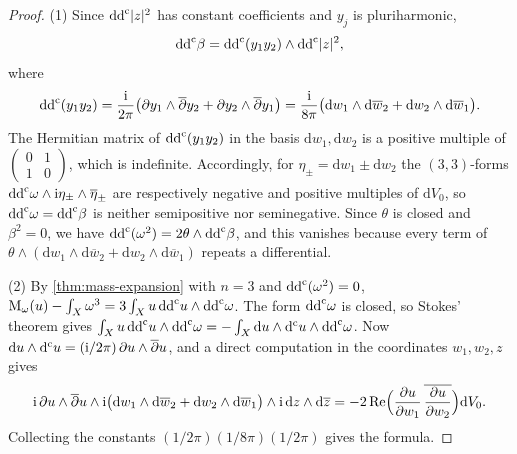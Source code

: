 \begin{proof}
(1) Since $\mathrm{dd}^{\mathrm{c}}|z|^2$ has constant coefficients and $y_j$ is pluriharmonic,
\[
 \mathrm{dd}^{\mathrm{c}}\beta=\mathrm{dd}^{\mathrm{c}}(y_1y_2)\wedge\mathrm{dd}^{\mathrm{c}}|z|^2,
\]
where
\[
 \mathrm{dd}^{\mathrm{c}}(y_1y_2)=\frac{\mathrm i}{2\pi}\bigl(\partial y_1\wedge\overline\partial y_2
       +\partial y_2\wedge\overline\partial y_1\bigr)
       =\frac{\mathrm i}{8\pi}\bigl(\mathrm dw_1\wedge\mathrm d\overline w_2
       +\mathrm dw_2\wedge\mathrm d\overline w_1\bigr).
\]
The Hermitian matrix of $\mathrm{dd}^{\mathrm{c}}(y_1y_2)$ in the basis $\mathrm dw_1,\mathrm dw_2$ is a positive multiple of $\left(\begin{smallmatrix}0&1\\1&0\end{smallmatrix}\right)$, which is indefinite. Accordingly, for $\eta_\pm=\mathrm dw_1\pm\mathrm dw_2$ the $(3,3)$-forms $\mathrm{dd}^{\mathrm{c}}\omega\wedge\mathrm i\eta_\pm\wedge\overline\eta_\pm$ are respectively negative and positive multiples of $\mathrm dV_0$, so $\mathrm{dd}^{\mathrm{c}}\omega=\mathrm{dd}^{\mathrm{c}}\beta$ is neither semipositive nor seminegative. Since $\theta$ is closed and $\beta^2=0$, we have $\mathrm{dd}^{\mathrm{c}}(\omega^2)=2\theta\wedge\mathrm{dd}^{\mathrm{c}}\beta$, and this vanishes because every term of $\theta\wedge(\mathrm dw_1\wedge\mathrm d\overline w_2+\mathrm dw_2\wedge\mathrm d\overline w_1)$ repeats a differential.

(2) By \cref{thm:mass-expansion} with $n=3$ and $\mathrm{dd}^{\mathrm{c}}(\omega^2)=0$, $\mathrm M_\omega(u)-\int_X\omega^3=3\int_Xu\,\mathrm{dd}^{\mathrm{c}} u\wedge\mathrm{dd}^{\mathrm{c}}\omega$. The form $\mathrm{dd}^{\mathrm{c}}\omega$ is closed, so Stokes' theorem gives $\int_Xu\,\mathrm{dd}^{\mathrm{c}} u\wedge\mathrm{dd}^{\mathrm{c}}\omega=-\int_X\mathrm du\wedge\mathrm d^{\mathrm c} u\wedge\mathrm{dd}^{\mathrm{c}}\omega$. Now $\mathrm du\wedge\mathrm d^{\mathrm c} u=(\mathrm i/2\pi)\,\partial u\wedge\overline\partial u$, and a direct computation in the coordinates $w_1,w_2,z$ gives
\[
 \mathrm i\,\partial u\wedge\overline\partial u\wedge
 \mathrm i\bigl(\mathrm dw_1\wedge\mathrm d\overline w_2+\mathrm dw_2\wedge\mathrm d\overline w_1\bigr)
 \wedge\mathrm i\,\mathrm dz\wedge\mathrm d\overline z
 =-2\operatorname{Re}\Bigl(\frac{\partial u}{\partial w_1}\,
       \overline{\frac{\partial u}{\partial w_2}}\Bigr)\mathrm dV_0.
\]
Collecting the constants $(1/2\pi)(1/8\pi)(1/2\pi)$ gives the formula.


\end{proof}

